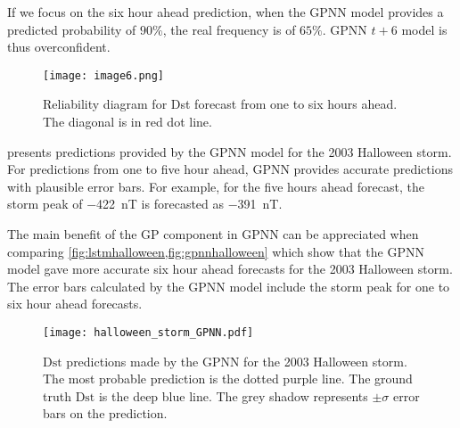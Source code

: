 If we focus on the six hour ahead prediction, when the GPNN model provides a predicted probability of $90\%$, the 
real frequency is of $65\%$. GPNN $t+6$ model is thus overconfident. 



\begin{figure}
	\texttt{[image: image6.png]}
	\caption{Reliability diagram for Dst forecast from one to six hours ahead. The diagonal is in red dot line.}
	\label{fig:gpnnreliability}
\end{figure}




 presents predictions provided by the GPNN model for the 2003 Halloween storm. 
For predictions from one to five hour ahead, GPNN provides accurate predictions with plausible error bars. 
For example, for the five hours ahead forecast, the storm peak of \SI{-422}{\nano\tesla} is forecasted as 
\SI{-391}{\nano\tesla}. 

The main benefit of the GP component in GPNN can be appreciated when comparing \cref{fig:lstmhalloween,fig:gpnnhalloween} which show that the GPNN model gave more accurate six hour ahead forecasts for the 
2003 Halloween storm. The error bars calculated by the GPNN model include the storm peak for one to six hour 
ahead forecasts.

\begin{figure}
	\texttt{[image: halloween\_storm\_GPNN.pdf]}
	\caption{$\mathrm{Dst}$ predictions made by the GPNN for the 2003 Halloween storm. 
	The most probable prediction is the dotted purple line. 
	The ground truth $\mathrm{Dst}$ is the deep blue line. 
	The grey shadow represents $\pm\sigma$ error bars on the prediction.}
    \label{fig:gpnnhalloween}
\end{figure}



